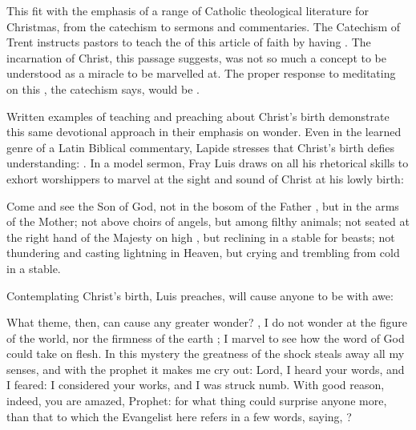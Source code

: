 This fit with the emphasis of a range of Catholic theological literature for
Christmas, from the catechism to sermons and commentaries.
The Catechism of Trent instructs pastors to teach the 
of this article of faith by having .%
    \Autocite[50]{Catholic:Catechismus1614}
The incarnation of Christ, this passage suggests, was not so much a concept to
be understood as a miracle to be marvelled at.
The proper response to meditating on this , the
catechism says, would be .%
    \Autocite[50]{Catholic:Catechismus1614}

Written examples of teaching and preaching about Christ's birth demonstrate this
same devotional approach in their emphasis on wonder.
Even in the learned genre of a Latin Biblical commentary, Lapide stresses that
Christ's birth defies understanding: 
.%
    \Autocite
    [50, on ]
    {Lapide:Gospels19C}
In a model sermon, Fray Luis draws on all his rhetorical skills to exhort
worshippers to marvel at the sight and sound of Christ at his lowly birth:
\begin{quoting}
    Come and see the Son of God, not in the bosom of the Father , but
    in the arms of the Mother; not above choirs of angels, but among filthy
    animals; not seated at the right hand of the Majesty on high ,
    but reclining in a stable for beasts; not thundering and casting lightning
    in Heaven, but crying and trembling from cold in a stable.%
        \Autocite[37]{LuisdeGranada:Xmas}
\end{quoting}
Contemplating Christ's birth, Luis preaches, will cause anyone to be
 with awe:
\begin{quoting}
    What theme, then, can cause any greater wonder? \Dots{} 
    , I do not wonder at the figure of the world, nor
    the firmness of the earth \Dots{}; I marvel to see how the word of God could
    take on flesh. \Dots{} 
    In this mystery the greatness of the shock steals away all my senses, and
    with the prophet  it makes me cry out: Lord, I heard your words,
    and I feared: I considered your works, and I was struck numb.
    With good reason, indeed, you are amazed, Prophet: for what thing could
    surprise anyone more, than that to which the Evangelist here refers in a few
    words, saying, ?%
        \Autocite[38]{LuisdeGranada:Xmas}
\end{quoting}

